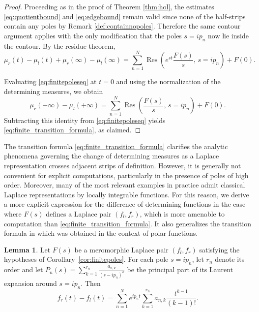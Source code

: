 \documentclass[12pt]{article}
\theoremstyle{definition}
\newtheorem{lemma}[theorem]{Lemma}
\DeclareMathOperator*{\Res}{Res}
\begin{document}
\begin{proof}

Proceeding as in the proof of Theorem \ref{thm:hol}, the estimates \eqref{eq:quotientbound} and \eqref{eq:edgebound} remain valid since none of the half-strips contain any poles by Remark \ref{def:containnopoles}. Therefore the same contour argument applies with the only modification that the poles \( s=ip_n \) now lie inside the contour.
By the residue theorem,
\begin{equation}\label{eq:finitepoleseq}
\mu_r(t)-\mu_l(t)+\mu_r(\infty)-\mu_l(\infty)
=
\sum_{n=1}^{N}
\Res\!\left(e^{st}\frac{F(s)}{s},\, s=ip_n\right)
+F(0).
\end{equation}

\noindent Evaluating \eqref{eq:finitepoleseq} at \( t=0 \) and using the normalization of the determining measures, we obtain
\[
\mu_r(-\infty)-\mu_l(+\infty)
=
\sum_{n=1}^{N}
\Res\!\left(\frac{F(s)}{s},\, s=ip_n\right)
+F(0).
\]
Subtracting this identity from \eqref{eq:finitepoleseq} yields \eqref{eq:finite_transition_formula}, as claimed.
\end{proof}

The transition formula \eqref{eq:finite_transition_formula} clarifies the analytic phenomena governing the change of determining measures as a Laplace representation crosses adjacent strips of definition. However, it is generally not convenient for explicit computations, particularly in the presence of poles of high order. Moreover, many of the most relevant examples in practice admit classical Laplace representations by locally integrable functions. For this reason, we derive a more explicit expression for the difference of determining functions in the case where $F(s)$ defines a Laplace pair $(f_l,f_r)$, which is more amenable to computation than \eqref{eq:finite_transition_formula}. It also generalizes the transition formula in \cite{BuescuPolar} which was obtained in the context of polar functions.


\begin{lemma}\label{lem:transitionforfinite}
Let $F(s)$ be a meromorphic Laplace pair $(f_l,f_r)$ satisfying the hypotheses of Corollary~\ref{cor:finitepoles}. 
For each pole $s=ip_n$, let $r_n$ denote its order and let
$\displaystyle{P_n(s)= \sum_{k=1}^{r_n}\frac{a_{n,k}}{(s-ip_n)^k}}$
be the principal part of its Laurent expansion around $s=ip_n$. Then
\begin{equation}\label{eq:transitionformula}
f_r(t)-f_l(t)= \sum_{n=1}^{N}e^{ip_nt}\sum_{k=1}^{r_n}a_{n,k}\frac{t^{k-1}}{(k-1)!}.
\end{equation}
\end{lemma}
\end{document}
